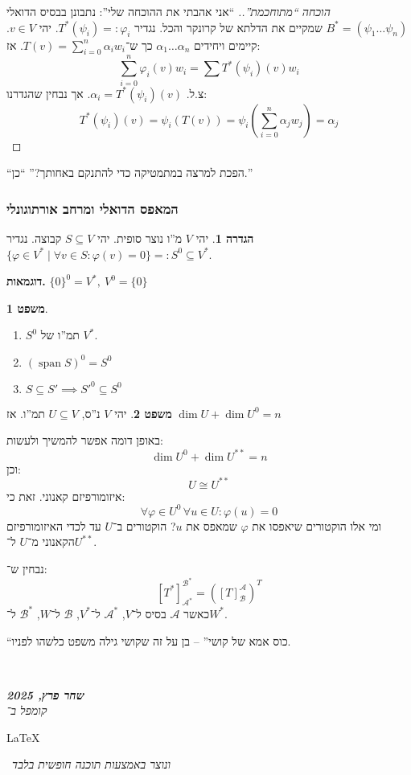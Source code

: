 \documentclass[a4paper]{article}
\newcommand\en[1] {\begin{otherlanguage}{english}#1\end{otherlanguage}}
\newcommand\ndoc  {\dotfill \\ \vfil {\begin{center}
			{\textbf{\textit{שחר פרץ, 2025}} \\
				\scriptsize \textit{קומפל ב־}\en{\LaTeX}\,\textit{ ונוצר באמצעות תוכנה חופשית בלבד}}
	\end{center}} \vfil	}
\newcommand\ac    {\mathcal{A}}
\newcommand\bc    {\mathcal{B}}
\newcommand\sumni     {\sum_{i = 0}^{n}}
\DeclareMathOperator{\Sp}      {span}
\newcommand\co        {\colon}
\newcommand\ag        {\alpha}
\newcommand\cl [1]    {\left ( #1 \right )}
\renewcommand\phi     {\varphi}
\theoremstyle{definition}
\newtheorem{Theorem}{משפט}
\newtheorem{definition}{הגדרה}
\newcommand\theo  [1] {\begin{Theorem}#1\end{Theorem}}
\newcommand\defi  [1] {\begin{definition}#1\end{definition}}
\begin{document}
	\begin{proof}[הוכחה ``מתוחכמת''.]
		``אני אהבתי את ההוכחה שלי'': נתבונן בבסיס הדואלי $B^* = (\psi_1 \dots \psi_n)$ שמקיים את הדלתא של קרונקר והכל. 
		נגדיר $T^*(\psi_i) =: \phi_i$. יהי $v \in V$. קיימים ויחידים $\ag_1 \dots \ag_n$ כך ש־$T(v) = \sumni \ag_i w_i$. אז: 
		\[ \sumni \phi_i(v)w_i = \sum T^*(\psi_i)(v) w_i \]
		צ.ל. $\ag_i = T^*(\psi_i)(v)$. אך נבחין שהגדרנו: 
		\[ T^*(\psi_i)(v) = \psi_i(T(v)) = \psi_i\cl{\sumni \ag_j w_j} = \ag_j \]
		
	\end{proof}
	
	``הפכת למרצה במתמטיקה כדי להתנקם באחותך?'' ``כן.''
	
	\subsubsection{המאפס הדואלי ומרחב אורתוגונלי}
	\defi{יהי $V$ מ''ו נוצר סופית. יהי $S \subseteq V$ קבוצה. נגדיר $\{\phi \in V^* \mid \forall v \in S \co \phi(v) = 0\} =: S^0 \subseteq V^*$. }
	
	\textbf{דוגמאות. } \hfil $\{0\}^0 = V^*, \ V^0 = \{0\}$
	
	\theo{\,
		\begin{enumerate}
			\item $S^0$ תמ''ו של $V^*$. 
			\item \hfil $(\Sp S)^0 = S^0$
			\item \hfil $S \subseteq S' \implies S'^0 \subseteq S^0$
	\end{enumerate}}
	
	\theo{יהי $V$ נ''ס, $U \subseteq V$ תמ''ו. אז $\dim U + \dim U^0 = n$}
	באופן דומה אפשר להמשיך ולעשות: 
	\[ \dim U^0 + \dim U^{**} = n \]
	וכן: 
	\[ U \cong U^{**} \]
	איזומורפיזם קאנוני. זאת כי:
	\[ \forall \phi \in U^0 \, \forall u \in U \co \phi(u) = 0 \]
	ומי אלו הוקטורים שיאפסו את $\phi$ שמאפס את $u$? הוקטורים ב־$U$ עד לכדי האיזומורפיזם הקאנוני מ־$U$ ל־$U^{**}$. 
	
	נבחין ש־: 
	\[ [T^*]^{\bc^*}_{\ac^*} = ([T]^{\ac}_{\bc})^T \]
	כאשר $\ac$ בסיס ל־$V$, $\ac^*$ ל־$V^*$, $\bc$ ל־$W$, $\bc^*$ ל־$W^*$. 
	
	``כוס אמא של קושי'' – בן על זה שקושי גילה משפט כלשהו לפניו. 
	
	\ndoc
	
	
	
	
	
\end{document}
